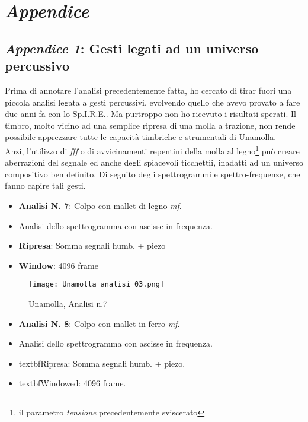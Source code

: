 
\chapter{\textit{Appendice}}
\label{chp:Appendice}
\section*{\textit{Appendice 1}: Gesti legati ad un universo percussivo}

Prima di annotare l’analisi precedentemente fatta, ho cercato di tirar fuori una piccola analisi legata a gesti percussivi, evolvendo quello che avevo provato a fare due anni fa con lo Sp.I.R.E.. Ma purtroppo non ho ricevuto i risultati sperati. Il timbro, molto vicino ad una semplice ripresa di una molla a trazione, non rende possibile apprezzare tutte le capacità timbriche e strumentali di Unamolla. \\
Anzi, l’utilizzo di \textit{fff} o di avvicinamenti repentini della molla al legno\footnote{il parametro \textit{tensione} precedentemente sviscerato} può creare aberrazioni del segnale ed anche degli spiacevoli ticchettii, inadatti ad un universo compositivo ben definito. 
Di seguito degli spettrogrammi e spettro-frequenze, che fanno capire tali gesti.
\begin{itemize}
\item{\textbf{Analisi N. 7}: Colpo con mallet di legno \textit{mf}.}
\item{Analisi dello spettrogramma con ascisse in frequenza.}
\item{\textbf{Ripresa}: Somma segnali humb. + piezo}
\item{\textbf{Window}: 4096 frame}
\end{itemize}

\begin{figure}

\begin{center}

\texttt{[image: Unamolla\_analisi\_03.png]}

\caption{Unamolla, Analisi n.7}

\label{fig:07_analisi_molla}

\end{center}

\end{figure}
\begin{itemize}
\item{\textbf{Analisi N. 8}: Colpo con mallet in ferro \textit{mf}.}
\item{Analisi dello spettrogramma con ascisse in frequenza.}
\item{textbf{Ripresa}: Somma segnali humb. + piezo.}
\item{textbf{Windowed}: 4096 frame.}
\end{itemize}

